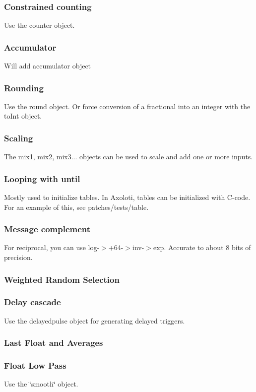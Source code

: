 \subsubsection*{Constrained counting}

Use the counter object.

\subsubsection*{Accumulator}

Will add accumulator object

\subsubsection*{Rounding}

Use the round object. Or force conversion of a fractional into an integer with the to\+Int object.

\subsubsection*{Scaling}

The mix1, mix2, mix3... objects can be used to scale and add one or more inputs.

\subsubsection*{Looping with until}

Mostly used to initialize tables. In Axoloti, tables can be initialized with C-\/code. For an example of this, see patches/tests/table.

\subsubsection*{Message complement}

For reciprocal, you can use log-\/$>$+64-\/$>$inv-\/$>$exp. Accurate to about 8 bits of precision.

\subsubsection*{Weighted Random Selection}

\subsubsection*{Delay cascade}

Use the delayedpulse object for generating delayed triggers.

\subsubsection*{Last Float and Averages}

\subsubsection*{Float Low Pass}

Use the \char`\"{}smooth\char`\"{} object. 